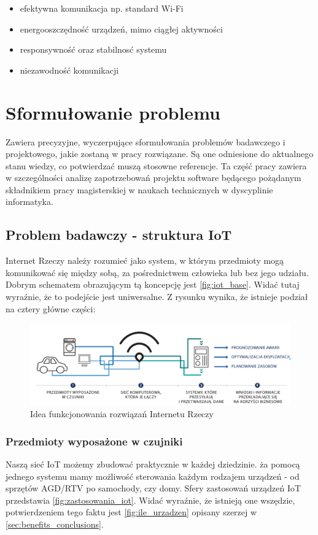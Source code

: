 \begin{itemize}
	\item efektywna komunikacja np. standard Wi-Fi
	\item energooszczędność urządzeń, mimo ciągłej aktywności
	\item responsywność oraz stabilnosć systemu
	\item niezawodność komunikacji
\end{itemize}


\section{Sformułowanie problemu}
\label{sec:sformulowanie-problemu}
Zawiera precyzyjne, wyczerpujące sformułowania problemów badawczego i projektowego, jakie zostaną w pracy rozwiązane. Są one odniesione do aktualnego stanu wiedzy, co potwierdzać muszą stosowne referencje. Ta część pracy zawiera w szczególności analizę zapotrzebowań projektu software będącego pożądanym składnikiem pracy magisterskiej w naukach technicznych w dyscyplinie informatyka.

\subsection{Problem badawczy - struktura IoT}
Internet Rzeczy należy rozumieć jako system, w którym przedmioty mogą komunikować się między sobą, za pośrednictwem człowieka lub bez jego udziału.
Dobrym schematem obrazującym tą koncepcję jest \autoref{fig:iot_base}. Widać tutaj wyraźnie, że to podejście jest uniwersalne. Z rysunku wynika, że istnieje podział na cztery główne części:

\begin{figure}[!htbp]
	\centering
	\includegraphics[width=1.0\textwidth]{images/iot.png}
	\caption[Idea funkcjonowania rozwiązań Internetu Rzeczy.]{Idea funkcjonowania rozwiązań Internetu Rzeczy}
	\label{fig:iot_base}
\end{figure}

\subsubsection{Przedmioty wyposażone w czujniki}
Naszą sieć IoT możemy zbudować praktycznie w każdej dziedzinie. ża pomocą jednego systemu mamy możliwość sterowania każdym rodzajem urządzeń - od sprzętów AGD/RTV po samochody, czy domy. Sfery zastosowań urządzeń IoT przedstawia \autoref{fig:zastosowania_iot}. Widać wyraźnie, że istnieją one wszędzie, potwierdzeniem tego faktu jest \autoref{fig:ile_urzadzen} opisany szerzej w \autoref{sec:benefits_conclusions}.

